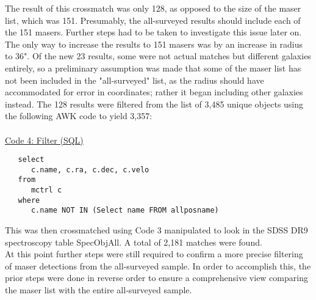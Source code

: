 \documentclass[12pt]{article}
\begin{document}
The result of this crossmatch was only 128, as opposed to the size of the maser list, which was 151. Presumably, the all-surveyed results should include each of the 151 masers. Further steps had to be taken to investigate this issue later on. The only way to increase the results to 151 masers was by an increase in radius to 36". Of the new 23 results, some were not actual matches but different galaxies entirely, so a preliminary assumption was made that some of the maser list has not been included in the "all-surveyed" list, as the radius should have accommodated for error in coordinates; rather it began including other galaxies instead. The 128 results were filtered from the list of 3,485 unique objects using the following AWK code to yield 3,357:\\
\\
\underline{Code 4: Filter (SQL)}
\begin{verbatim}   select
      c.name, c.ra, c.dec, c.velo
   from
      mctrl c
   where
      c.name NOT IN (Select name FROM allposname)
\end{verbatim}This was then crossmatched using Code 3 manipulated to look in the SDSS DR9 spectroscopy table SpecObjAll. A total of 2,181 matches were found.\\

At this point further steps were still required to confirm a more precise filtering of maser detections from the all-surveyed sample. In order to accomplish this, the prior steps were done in reverse order to ensure a comprehensive view comparing the maser list with the entire all-surveyed sample.\\
\end{document}
